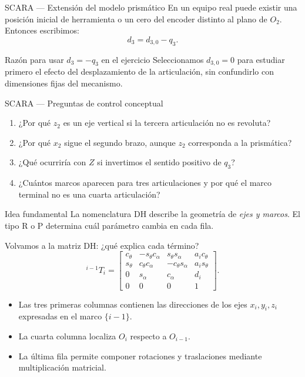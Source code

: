 \documentclass[aspectratio=169,11pt]{beamer}
\begin{document}
\begin{frame}[t]{SCARA — Extensión del modelo prismático}
 \small
 En un equipo real puede existir una posición inicial de herramienta
 o un cero del encoder distinto al plano de $O_2$.
 Entonces escribimos:
 \[
 \boxed{d_3=d_{3,0}-q_3.}
 \]
 \pause
 \begin{block}{Razón para usar $d_3=-q_3$ en el ejercicio}
 Seleccionamos $d_{3,0}=0$ para estudiar primero el efecto del
 desplazamiento de la articulación, sin confundirlo con dimensiones
 fijas del mecanismo.
 \end{block}
\end{frame}

\begin{frame}[t]{SCARA — Preguntas de control conceptual}
 \small
 \begin{enumerate}
  \item ¿Por qué $z_2$ es un eje vertical si la tercera articulación
        no es revoluta?
  \item ¿Por qué $x_2$ sigue el segundo brazo, aunque $z_2$
        corresponda a la prismática?
  \item ¿Qué ocurriría con $Z$ si invertimos el sentido positivo de $q_3$?
  \item ¿Cuántos marcos aparecen para tres articulaciones y
        por qué el marco terminal no es una cuarta articulación?
 \end{enumerate}
 \pause
 \begin{alertblock}{Idea fundamental}
 La nomenclatura DH describe la geometría de \emph{ejes y marcos}.
 El tipo R o P determina cuál parámetro cambia en cada fila.
 \end{alertblock}
\end{frame}

\begin{frame}[t]{Volvamos a la matriz DH: ¿qué explica cada término?}
 \scriptsize
 \[
 {}^{i-1}T_i=\begin{bmatrix}
 c_\theta&-s_\theta c_\alpha&s_\theta s_\alpha&a_ic_\theta\\
 s_\theta&c_\theta c_\alpha&-c_\theta s_\alpha&a_is_\theta\\
 0&s_\alpha&c_\alpha&d_i\\0&0&0&1
 \end{bmatrix}.
 \]
 \pause
 \small
 \begin{itemize}
  \item Las tres primeras columnas contienen las direcciones de los
        ejes $x_i,y_i,z_i$ expresadas en el marco $\{i-1\}$.
  \item La cuarta columna localiza $O_i$ respecto a $O_{i-1}$.
  \item La última fila permite componer rotaciones y traslaciones
        mediante multiplicación matricial.
 \end{itemize}
\end{frame}
\end{document}
